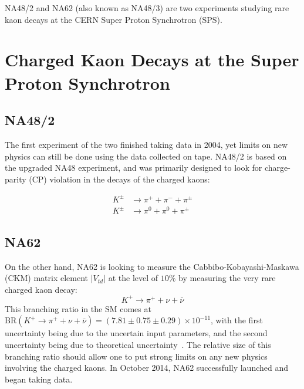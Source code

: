 NA48/2 \cite{Batley:1999fv} and NA62 \cite{Martellotti:2015kna} (also known as NA48/3) are two experiments studying rare kaon decays at the CERN Super Proton Synchrotron (SPS).
\section{Charged Kaon Decays at the Super Proton Synchrotron}

\subsection{NA48/2}
The first experiment of the two finished taking data in 2004, yet limits on new physics can still be done using the data collected on tape.
NA48/2 is based on the upgraded NA48 experiment, and was primarily designed to look for charge-parity (CP) violation in the decays of the charged kaons:

\begin{align}
K^\pm & \rightarrow \pi^+ + \pi^- + \pi^\pm \\
K^\pm & \rightarrow \pi^0 + \pi^0 + \pi^\pm
\end{align}

\subsection{NA62}
On the other hand, NA62 is looking to measure the Cabbibo-Kobayashi-Maskawa (CKM) matrix element $|V_{td}|$ at the level of $10\%$ by measuring the very rare charged kaon decay:
\begin{equation}
K^+ \rightarrow \pi^+ + \nu + \bar{\nu}
\end{equation}
This branching ratio in the SM comes at $\textrm{BR}(K^+ \rightarrow \pi^+ + \nu + \bar{\nu}) = (7.81 \pm 0.75 \pm 0.29) \times 10^{-11}$, with the first uncertainty being due to the uncertain input parameters, and the second uncertainty being due to theoretical uncertainty~\cite{Straub:2010ih}.
The relative size of this branching ratio should allow one to put strong limits on any new physics involving the charged kaons.
In October 2014, NA62 successfully launched and began taking data.
